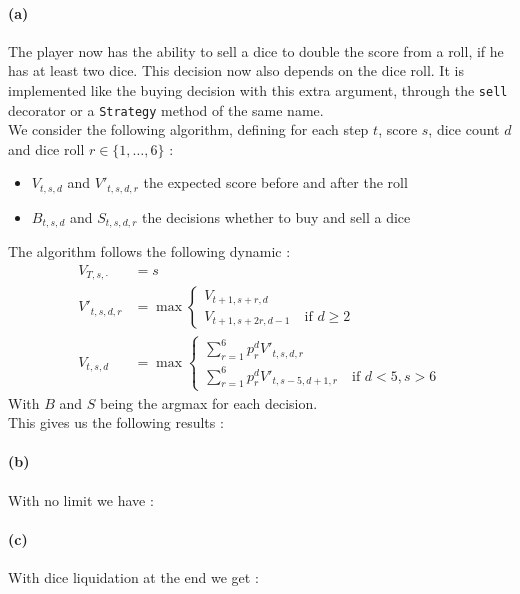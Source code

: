\documentclass{article}
\newcommand{\dice}{\{1,\dots,6\}}
\newcommand{\getoutput}[1]{}
\begin{document}
    \paragraph{(a)}
    The player now has the ability to sell a dice to double the score from a roll,
    if he has at least two dice. This decision now also depends on the dice roll.
    It is implemented like the buying decision with this extra argument,
    through the \texttt{sell} decorator or a \texttt{Strategy} method of the same name.\\
    We consider the following algorithm, defining for each step $t$, score $s$, dice count $d$
    and dice roll $r\in\dice$ :
    \begin{itemize}
        \item $V_{t,s,d}$ and $V'_{t,s,d,r}$ the expected score before and after the roll
        \item $B_{t,s,d}$ and $S_{t,s,d,r}$ the decisions whether to buy and sell a dice
    \end{itemize}
    The algorithm follows the following dynamic :
    \begin{align}
        V_{T,s,\cdot} &= s\\
        V'_{t,s,d,r} &= \max
        \begin{cases}
            V_{t+1,s+r,d}\\
            V_{t+1,s+2r,d-1}\quad\text{if }d\geq2
        \end{cases}\\
        V_{t,s,d} &= \max
        \begin{cases}
            \sum_{r=1}^6p^d_rV'_{t,s,d,r}\\
            \sum_{r=1}^6p^d_rV'_{t,s-5,d+1,r}\quad\text{if }d<5,s > 6
        \end{cases}
    \end{align}
    With $B$ and $S$ being the argmax for each decision.\\
    This gives us the following results :
    \getoutput{2a}

    \paragraph{(b)}
    With no limit we have :
    \getoutput{2b}

    \paragraph{(c)}
    With dice liquidation at the end we get :
    \getoutput{2c}
\end{document}
